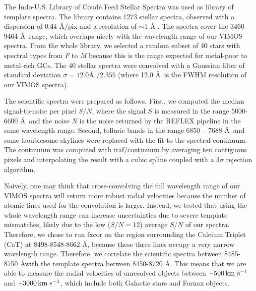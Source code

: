 The Indo-U.S. Library of Coud\'e Feed Stellar Spectra \citep{Valdes04} was used 
as library of template spectra. The library contains 1273 stellar spectra, 
observed with a dispersion of $0.44$ \AA /pix and a resolution of $\sim 1$ \AA 
. The spectra cover the 3460 -- 9464 \AA\ range, which overlaps nicely with the 
wavelength range of our VIMOS spectra. From the whole library, we selected a 
random subset of 40 stars with spectral types from \textit{F} to \textit{M} 
because this is the range expected for metal-poor to metal-rich GCs. The 40 
stellar spectra were convolved with a Gaussian filter of standard deviation 
$\sigma = 12.0\mbox{\AA\ } / 2.355$ (where 12.0 \AA\ is the FWHM resolution of 
our VIMOS spectra). 

The scientific spectra were prepared as follows. First, we computed the median 
signal-to-noise per pixel $S/N$, where the signal $S$ is measured in the range 
5000-6600 \AA\ and the noise $N$ is the noise returned by the REFLEX pipeline 
in the same wavelength range. Second, telluric bands in the range 6850 -- 7688 
\AA\ and some troublesome skylines were replaced with the fit to the spectral 
continuum. The continuum was computed with iraf/continuum by averaging ten 
contiguous pixels and interpolating the result with a cubic spline coupled with 
a $3\sigma$ rejection algorithm.  

Naively, one may think that cross-convolving the full wavelength range of our 
VIMOS spectra will return more robust radial velocities because the number of 
atomic lines used for the convolution is larger. Instead, we tested that using 
the whole wavelength range can increase uncertainties due to severe template 
mismatches, likely due to the low ($S/N = 12$) average $S/N$ of our spectra. 
Therefore, we chose to run fxcor on the region surrounding the Calcium Triplet 
(CaT) at 8498-8548-8662 \AA , because these three lines occupy a very narrow 
wavelength range. Therefore, we correlate the scientific spectra between 
8485-8750 \AA with the template spectra between 8450-8720 \AA . This means that 
we are able to measure the radial velocities of unresolved objects between 
$-500 \mbox{\,km~s$^{-1}$}$ and $+3000\mbox{\,km~s$^{-1}$}$, which include both Galactic stars and Fornax 
objects.   

